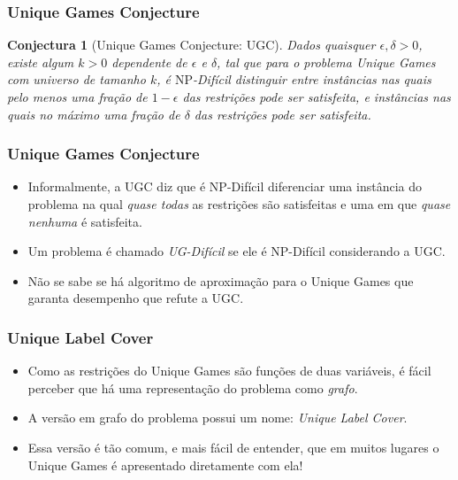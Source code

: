 \documentclass[11pt, handout]{beamer}
\newcommand{\np}{\ensuremath{\mathrm{NP}}\xspace}
\newtheorem{conjectura}{Conjectura}
\begin{document}
\begin{frame}
    \frametitle{Unique Games Conjecture}
    \begin{conjectura}[Unique Games Conjecture: UGC]
        Dados quaisquer $\epsilon,\delta>0$, existe algum $k>0$ dependente de  $\epsilon$ e $\delta$, tal que para o problema Unique Games com universo de tamanho $k$, é \emph{\np-Difícil} distinguir entre instâncias nas quais pelo menos uma fração de $1-\epsilon$ das restrições pode ser satisfeita, e instâncias nas quais no máximo uma fração de $\delta$ das restrições pode ser satisfeita.
    \end{conjectura}
\end{frame}

\begin{frame}[<+->]
    \frametitle{Unique Games Conjecture}
    \begin{itemize}
        \item Informalmente, a UGC diz que é \np-Difícil diferenciar uma instância do problema na qual \emph{quase todas} as restrições são satisfeitas e uma em que \emph{quase nenhuma} é satisfeita.
        \item Um problema é chamado \emph{UG-Difícil} se ele é \np-Difícil considerando a UGC.
        \item Não se sabe se há algoritmo de aproximação para o Unique Games que garanta desempenho que refute a UGC.
    \end{itemize}
\end{frame}

\begin{frame}[<+->]
    \frametitle{Unique Label Cover}
    \begin{itemize}
        \item Como as restrições do Unique Games são funções de duas variáveis, é fácil perceber que há uma representação do problema como \emph{grafo}.
        \item A versão em grafo do problema possui um nome: \emph{Unique Label Cover}.
        \item Essa versão é tão comum, e mais fácil de entender, que em muitos lugares o Unique Games é apresentado diretamente com ela!
    \end{itemize}
\end{frame}
\end{document}

